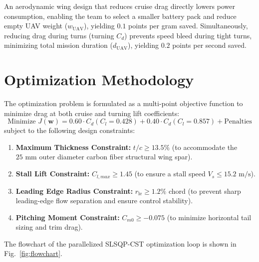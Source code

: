 \documentclass[11pt]{article}
\begin{document}
An aerodynamic wing design that reduces cruise drag directly lowers power consumption, enabling the team to select a smaller battery pack and reduce empty UAV weight ($w_{\text{UAV}}$), yielding $0.1$ points per gram saved. Simultaneously, reducing drag during turns (turning $C_d$) prevents speed bleed during tight turns, minimizing total mission duration ($d_{\text{UAV}}$), yielding $0.2$ points per second saved.

\section{Optimization Methodology}
The optimization problem is formulated as a multi-point objective function to minimize drag at both cruise and turning lift coefficients:
\begin{equation}
    \text{Minimize } J(\mathbf{w}) = 0.60 \cdot C_d(C_l=0.428) + 0.40 \cdot C_d(C_l=0.857) + \text{Penalties}
\end{equation}
subject to the following design constraints:
\begin{enumerate}
    \item \textbf{Maximum Thickness Constraint:} $t/c \ge 13.5\%$ (to accommodate the $25\text{ mm}$ outer diameter carbon fiber structural wing spar).
    \item \textbf{Stall Lift Constraint:} $C_{l,max} \ge 1.45$ (to ensure a stall speed $V_s \le 15.2\text{ m/s}$).
    \item \textbf{Leading Edge Radius Constraint:} $r_{\text{le}} \ge 1.2\%$ chord (to prevent sharp leading-edge flow separation and ensure control stability).
    \item \textbf{Pitching Moment Constraint:} $C_{m0} \ge -0.075$ (to minimize horizontal tail sizing and trim drag).
\end{enumerate}

The flowchart of the parallelized SLSQP-CST optimization loop is shown in Fig.~\ref{fig:flowchart}.
\end{document}
